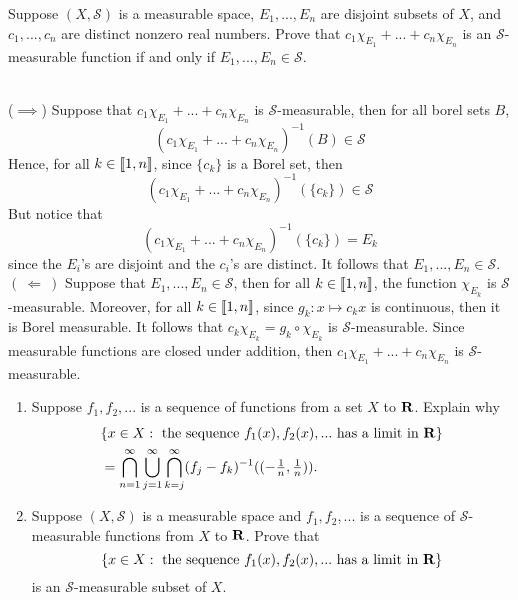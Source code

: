 \begin{exercise}
    Suppose $(X, \mathcal{S})$ is a measurable space, $E_1, ..., E_n$ are disjoint subsets of $X$, and $c_1, ..., c_n$ are distinct nonzero real numbers. Prove that $c_1\chi_{E_1} + ... + c_n\chi_{E_n}$ is an $\mathcal{S}$-measurable function if and only if $E_1, ..., E_n \in \mathcal{S}$.\\
\end{exercise}

\begin{solution}
    \\ ($\implies$) Suppose that $c_1\chi_{E_1} + ... + c_n\chi_{E_n}$ is $\mathcal{S}$-measurable, then for all borel sets $B$,
    $$(c_1\chi_{E_1} + ... + c_n\chi_{E_n})^{-1}(B)\in\mathcal{S}$$
    Hence, for all $k \in \llbracket 1 , n \rrbracket$, since $\{c_k\}$ is a Borel set, then 
    $$(c_1\chi_{E_1} + ... + c_n\chi_{E_n})^{-1}(\{c_k\})\in\mathcal{S}$$
    But notice that
    $$(c_1\chi_{E_1} + ... + c_n\chi_{E_n})^{-1}(\{c_k\}) = E_k$$
    since the $E_i$'s are disjoint and the $c_i$'s are distinct. It follows that $E_1, ..., E_n \in \mathcal{S}$.\\
    $( \ \Longleftarrow \ )$ Suppose that $E_1, ..., E_n \in \mathcal{S}$, then for all $k \in \llbracket 1 , n \rrbracket$, the function $\chi_{E_k}$ is $\mathcal{S}$-measurable. Moreover, for all $k \in \llbracket 1 , n \rrbracket$, since $g_k : x \mapsto c_k x$ is continuous, then it is Borel measurable. It follows that $c_k \chi_{E_k} = g_k \circ \chi_{E_k}$ is $\mathcal{S}$-measurable. Since measurable functions are closed under addition, then $c_1\chi_{E_1} + ... + c_n\chi_{E_n}$ is $\mathcal{S}$-measurable. \\
\end{solution}

\begin{exercise}
    \begin{enumerate}[label = (\alph*)]
        \item Suppose $f_1, f_2, ...$ is a sequence of functions from a set $X$ to $\mathbf{R}$. Explain why 
        \begin{align*}
            &\{x \in X : \text{ the sequence } f_1(x), f_2(x), ... \text{ has a limit in } \mathbf{R} \} \\
            &= \bigcap_{n=1}^{\infty}\bigcup_{j=1}^{\infty}\bigcap_{k=j}^{\infty}(f_j - f_k)^{-1}((- \tfrac{1}{n}, \tfrac{1}{n})).
        \end{align*}
        \item Suppose $(X, \mathcal{S})$ is a measurable space and $f_1, f_2, ...$ is a sequence of $\mathcal{S}$-measurable functions from $X$ to $\mathbf{R}$. Prove that
        $$\{x \in X : \text{ the sequence } f_1(x), f_2(x), ... \text{ has a limit in } \mathbf{R} \}$$
        is an $\mathcal{S}$-measurable subset of $X$.\\
    \end{enumerate}
\end{exercise}
 
